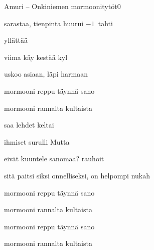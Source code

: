 \documentclass[12pt,a4paper]{article}
\begin{document}
\thispagestyle{empty}
\begin{mysong}{Amuri – Onkiniemen mormoonitytöt}{0}

\begin{SBVerse}
   sarastaa,  tienpinta huurui
  {\SBLyricNoteFont $-1$~tahti}

   yllättää  

   viima käy   kestää
  kyl 

   uskoo asiaan,   läpi harmaan
   
\end{SBVerse}

\begin{SBChorus}
   mormooni  reppu täynnä
  sano 

   mormooni  rannalta kultaista
   
\end{SBChorus}

\begin{SBVerse}
   saa  lehdet  keltai

   ihmiset surulli Mutta  

   eivät kuuntele  sanomaa? 
  rauhoit 

   sitä paitsi siksi  onnelliseksi,  on
  helpompi nukah 
\end{SBVerse}

\begin{SBChorus}
   mormooni  reppu täynnä
  sano 

   mormooni  rannalta kultaista
   
\end{SBChorus}


\begin{SBChorus}
   mormooni  reppu täynnä
  sano 

   mormooni  rannalta kultaista
   
\end{SBChorus}



\end{mysong}
\end{document}
